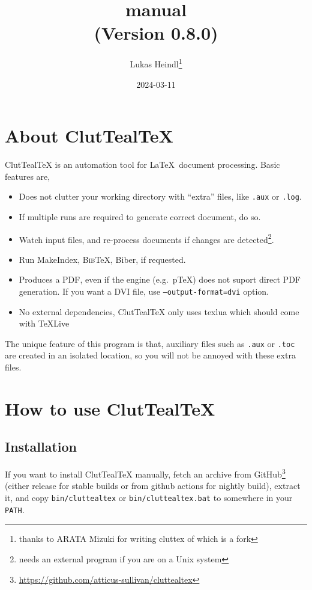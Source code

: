 \documentclass[a4paper]{report}
\title{\CluttealTeX manual\\(Version 0.8.0)}
\author{Lukas Heindl\thanks{thanks to ARATA Mizuki for writing cluttex of which \CluttealTeX is a fork}}
\date{2024-03-11}
\newcommand\CluttealTeX{ClutTeal\TeX\xspace}
\providecommand\BibTeX{\textsc{Bib}\TeX\xspace}
\begin{document}
\maketitle
\tableofcontents

\chapter{About \CluttealTeX}
\CluttealTeX is an automation tool for \LaTeX\ document processing.
Basic features are,
\begin{itemize}
\item Does not clutter your working directory with ``extra'' files, like \texttt{.aux} or \texttt{.log}.
\item If multiple runs are required to generate correct document, do so.
\item Watch input files, and re-process documents if changes are detected\footnote{needs an external program if you are on a Unix system}.
\item Run MakeIndex, \BibTeX, Biber, if requested.
\item Produces a PDF, even if the engine (e.g.\ p\TeX) does not suport direct PDF generation.
  If you want a DVI file, use \texttt{--output-format=dvi} option.
\item No external dependencies, \CluttealTeX only uses texlua which should come with TeXLive
\end{itemize}

The unique feature of this program is that, auxiliary files such as \texttt{.aux} or \texttt{.toc} are created in an isolated location, so you will not be annoyed with these extra files.


\chapter{How to use \CluttealTeX}
\section{Installation}
If you want to install \CluttealTeX manually, fetch an archive from
GitHub\footnote{\url{https://github.com/atticus-sullivan/cluttealtex}} (either
release for stable builds or from github actions for nightly build), extract
it, and copy \texttt{bin/cluttealtex} or \texttt{bin/cluttealtex.bat} to
somewhere in your \texttt{PATH}.
\end{document}
